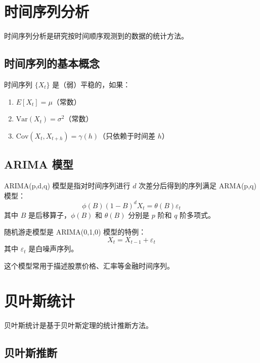 \section{时间序列分析}\label{sec:time-series}

时间序列分析是研究按时间顺序观测到的数据的统计方法。

\subsection{时间序列的基本概念}

\begin{definition}[平稳时间序列]\label{def:stationary-time-series}
时间序列 $\{X_t\}$ 是（弱）平稳的，如果：
\begin{enumerate}
    \item $E[X_t] = \mu$（常数）
    \item $\text{Var}(X_t) = \sigma^2$（常数）
    \item $\text{Cov}(X_t, X_{t+h}) = \gamma(h)$（只依赖于时间差 $h$）
\end{enumerate}
\end{definition}

\subsection{ARIMA 模型}

\begin{definition}[ARIMA 模型]\label{def:arima}
ARIMA(p,d,q) 模型是指对时间序列进行 $d$ 次差分后得到的序列满足 ARMA(p,q) 模型：
\[
\phi(B)(1-B)^d X_t = \theta(B)\varepsilon_t
\]
其中 $B$ 是后移算子，$\phi(B)$ 和 $\theta(B)$ 分别是 $p$ 阶和 $q$ 阶多项式。
\end{definition}

\begin{examplebox}[title=随机游走模型]
随机游走模型是 ARIMA(0,1,0) 模型的特例：
\[
X_t = X_{t-1} + \varepsilon_t
\]
其中 $\varepsilon_t$ 是白噪声序列。

这个模型常用于描述股票价格、汇率等金融时间序列。
\end{examplebox}

\section{贝叶斯统计}\label{sec:bayesian-statistics}

贝叶斯统计是基于贝叶斯定理的统计推断方法。

\subsection{贝叶斯推断}

